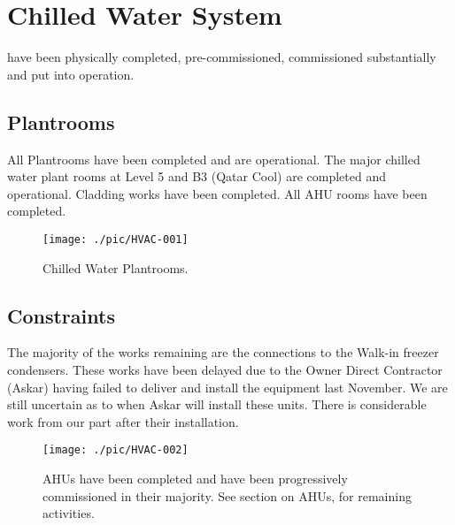 \chapter{Chilled Water System}
\label{chilledwater}
\normalsize

  have been physically completed, pre-commissioned, commissioned substantially and put into operation.

\section{Plantrooms}

All Plantrooms have been completed and are operational. The major chilled water plant rooms at Level 5 and B3 (Qatar Cool) are completed and operational. Cladding works have been completed. All AHU rooms have been completed.
 
 \begin{figure*}
\texttt{[image: ./pic/HVAC-001]}
\caption{Chilled Water Plantrooms.}
\end{figure*}



\section{Constraints}

The majority of the works remaining are the connections to the Walk-in freezer condensers. These works have been delayed due to the Owner Direct Contractor (Askar) having failed to deliver and install the equipment last November. We are still uncertain as to when Askar will install these units. There is considerable work from our part after their installation.

\label{chilledwaterconstraints}
 \begin{figure*}
\texttt{[image: ./pic/HVAC-002]}
\caption{AHUs have been completed and have been progressively commissioned in their majority. See section on AHUs, for remaining activities.}
\end{figure*}


